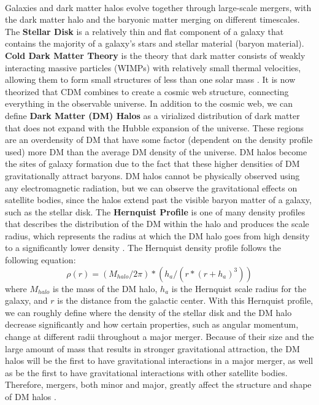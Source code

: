 \documentclass[fleqn,usenatbib]{mnras}
\begin{document}
\paragraph{} Galaxies and dark matter halos evolve together through large-scale mergers, with the dark matter halo and the baryonic matter merging on different timescales. The \textbf{Stellar Disk} is a relatively thin and flat component of a galaxy that contains the majority of a galaxy's stars and stellar material (baryon material). \textbf{Cold Dark Matter Theory} is the theory that dark matter consists of weakly interacting massive particles (WIMPs) with relatively small thermal velocities, allowing them to form small structures of less than one solar mass \citep{Diemand+2011}. It is now theorized that CDM combines to create a cosmic web structure, connecting everything in the observable universe. In addition to the cosmic web, we can define \textbf{Dark Matter (DM) Halos} as a virialized distribution of dark matter that does not expand with the Hubble expansion of the universe. These regions are an overdensity of DM that have some factor (dependent on the density profile used) more DM than the average DM density of the universe. DM halos become the sites of galaxy formation due to the fact that these higher densities of DM gravitationally attract baryons. DM halos cannot be physically observed using any electromagnetic radiation, but we can observe the gravitational effects on satellite bodies, since the halos extend past the visible baryon matter of a galaxy, such as the stellar disk. The \textbf{Hernquist Profile} is one of many density profiles that describes the distribution of the DM within the halo and produces the scale radius, which represents the radius at which the DM halo goes from high density to a significantly lower density \citep{Hern+1990, Dubinski+1999}. The Hernquist density profile follows the following equation:
\begin{equation}
    \rho(r) = (M_{halo} / 2\pi) * (h_a/(r*(r+h_a)^3))
\end{equation}
where $M_{halo}$ is the mass of the DM halo, $h_a$ is the Hernquist scale radius for the galaxy, and $r$ is the distance from the galactic center. With this Hernquist profile, we can roughly define where the density of the stellar disk and the DM halo decrease significantly and how certain properties, such as angular momentum, change at different radii throughout a major merger. Because of their size and the large amount of mass that results in stronger gravitational attraction, the DM halos will be the first to have gravitational interactions in a major merger, as well as be the first to have gravitational interactions with other satellite bodies. Therefore, mergers, both minor and major, greatly affect the structure and shape of DM halos \citep{Drakos+2019}.
\end{document}

